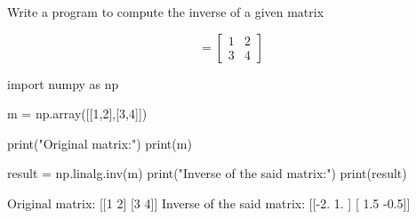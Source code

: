 \cprotEnv\begin{question}
Write a program to compute the inverse of a given matrix

\begin{equation*}
	[M] = \begin{bmatrix}
		1& 2\\
		3& 4
	\end{bmatrix}
\end{equation*}
\end{question}

\cprotEnv\begin{solution}
\begin{ipython}
import numpy as np

m = np.array([[1,2],[3,4]])

print("Original matrix:")
print(m)

result =  np.linalg.inv(m)
print("Inverse of the said matrix:")
print(result)
\end{ipython}
\begin{ioutput}

Original matrix:
[[1 2]
 [3 4]]
Inverse of the said matrix:
[[-2.   1. ]
 [ 1.5 -0.5]]
\end{ioutput}
\end{solution}

